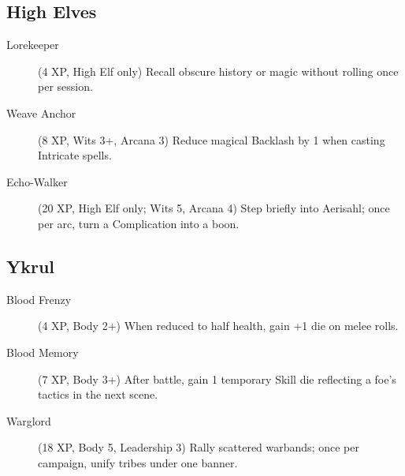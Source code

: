 \subsection{High Elves}

\begin{description}
\item[Lorekeeper] (4 XP, High Elf only) Recall obscure history or magic without rolling once per session.
\item[Weave Anchor] (8 XP, Wits 3+, Arcana 3) Reduce magical Backlash by 1 when casting Intricate spells.
\item[Echo-Walker] (20 XP, High Elf only; Wits 5, Arcana 4) Step briefly into Aerisahl; once per arc, turn a Complication into a boon.
\end{description}

\subsection{Ykrul}

\begin{description}
\item[Blood Frenzy] (4 XP, Body 2+) When reduced to half health, gain +1 die on melee rolls.
\item[Blood Memory] (7 XP, Body 3+) After battle, gain 1 temporary Skill die reflecting a foe's tactics in the next scene.
\item[Warglord] (18 XP, Body 5, Leadership 3) Rally scattered warbands; once per campaign, unify tribes under one banner.
\end{description}

